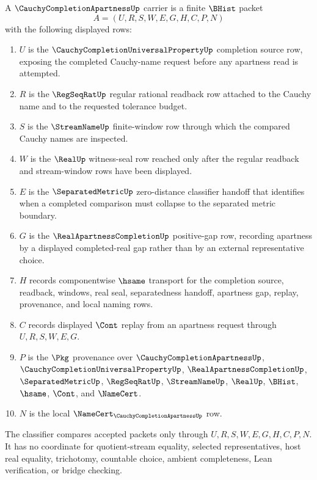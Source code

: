 \begin{definition}
\label{def:cauchy-completion-apartness-carrier}
A $\CauchyCompletionApartnessUp$ carrier is a finite $\BHist$ packet
$$
A=(U,R,S,W,E,G,H,C,P,N)
$$
with the following displayed rows:
\begin{enumerate}
\item $U$ is the $\CauchyCompletionUniversalPropertyUp$ completion source row, exposing the completed Cauchy-name request before any apartness read is attempted.
\item $R$ is the $\RegSeqRatUp$ regular rational readback row attached to the Cauchy name and to the requested tolerance budget.
\item $S$ is the $\StreamNameUp$ finite-window row through which the compared Cauchy names are inspected.
\item $W$ is the $\RealUp$ witness-seal row reached only after the regular readback and stream-window rows have been displayed.
\item $E$ is the $\SeparatedMetricUp$ zero-distance classifier handoff that identifies when a completed comparison must collapse to the separated metric boundary.
\item $G$ is the $\RealApartnessCompletionUp$ positive-gap row, recording apartness by a displayed completed-real gap rather than by an external representative choice.
\item $H$ records componentwise $\hsame$ transport for the completion source, readback, windows, real seal, separatedness handoff, apartness gap, replay, provenance, and local naming rows.
\item $C$ records displayed $\Cont$ replay from an apartness request through $U,R,S,W,E,G$.
\item $P$ is the $\Pkg$ provenance over $\CauchyCompletionApartnessUp$, $\CauchyCompletionUniversalPropertyUp$, $\RealApartnessCompletionUp$, $\SeparatedMetricUp$, $\RegSeqRatUp$, $\StreamNameUp$, $\RealUp$, $\BHist$, $\hsame$, $\Cont$, and $\NameCert$.
\item $N$ is the local $\NameCert_{\CauchyCompletionApartnessUp}$ row.
\end{enumerate}
The classifier compares accepted packets only through $U,R,S,W,E,G,H,C,P,N$. It has no coordinate for quotient-stream equality, selected representatives, host real equality, trichotomy, countable choice, ambient completeness, Lean verification, or bridge checking.
\end{definition}


